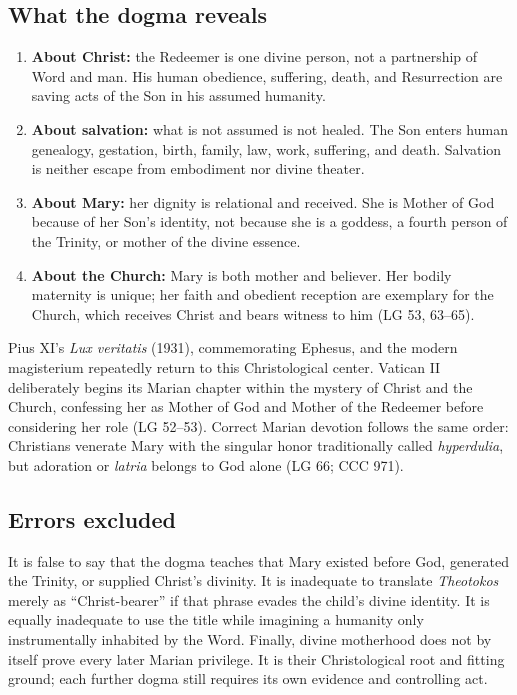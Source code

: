 \subsection{What the dogma reveals}

\begin{enumerate}
  \item \textbf{About Christ:} the Redeemer is one divine person, not a partnership of Word and man. His human obedience, suffering, death, and Resurrection are saving acts of the Son in his assumed humanity.
  \item \textbf{About salvation:} what is not assumed is not healed. The Son enters human genealogy, gestation, birth, family, law, work, suffering, and death. Salvation is neither escape from embodiment nor divine theater.
  \item \textbf{About Mary:} her dignity is relational and received. She is Mother of God because of her Son's identity, not because she is a goddess, a fourth person of the Trinity, or mother of the divine essence.
  \item \textbf{About the Church:} Mary is both mother and believer. Her bodily maternity is unique; her faith and obedient reception are exemplary for the Church, which receives Christ and bears witness to him (LG 53, 63--65).
\end{enumerate}

Pius XI's \emph{Lux veritatis} (1931), commemorating Ephesus, and the modern magisterium repeatedly return to this Christological center. Vatican II deliberately begins its Marian chapter within the mystery of Christ and the Church, confessing her as Mother of God and Mother of the Redeemer before considering her role (LG 52--53). Correct Marian devotion follows the same order: Christians venerate Mary with the singular honor traditionally called \emph{hyperdulia}, but adoration or \emph{latria} belongs to God alone (LG 66; CCC 971).

\subsection{Errors excluded}

It is false to say that the dogma teaches that Mary existed before God, generated the Trinity, or supplied Christ's divinity. It is inadequate to translate \emph{Theotokos} merely as ``Christ-bearer'' if that phrase evades the child's divine identity. It is equally inadequate to use the title while imagining a humanity only instrumentally inhabited by the Word. Finally, divine motherhood does not by itself prove every later Marian privilege. It is their Christological root and fitting ground; each further dogma still requires its own evidence and controlling act.
